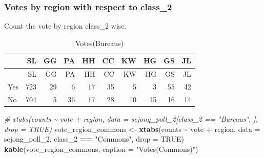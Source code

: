 \documentclass[
]{article}
\newenvironment{Shaded}{\begin{snugshade}}{\end{snugshade}}
\newcommand{\CommentTok}[1]{\textcolor[rgb]{0.56,0.35,0.01}{\textit{#1}}}
\newcommand{\DataTypeTok}[1]{\textcolor[rgb]{0.13,0.29,0.53}{#1}}
\newcommand{\DecValTok}[1]{\textcolor[rgb]{0.00,0.00,0.81}{#1}}
\newcommand{\KeywordTok}[1]{\textcolor[rgb]{0.13,0.29,0.53}{\textbf{#1}}}
\newcommand{\NormalTok}[1]{#1}
\newcommand{\OperatorTok}[1]{\textcolor[rgb]{0.81,0.36,0.00}{\textbf{#1}}}
\newcommand{\OtherTok}[1]{\textcolor[rgb]{0.56,0.35,0.01}{#1}}
\newcommand{\StringTok}[1]{\textcolor[rgb]{0.31,0.60,0.02}{#1}}
\begin{document}
\hypertarget{votes-by-region-with-respect-to-class_2}{%
\subsubsection{Votes by region with respect to
class\_2}\label{votes-by-region-with-respect-to-class_2}}

Count the vote by region class\_2 wise.

\begin{Shaded}
\end{Shaded}

\begin{longtable}[]{@{}lrrrrrrrrr@{}}
\caption{Votes(Bureaus)}\tabularnewline
\toprule
& SL & GG & PA & HH & CC & KW & HG & GS & JL\tabularnewline
\midrule
\endfirsthead
\toprule
& SL & GG & PA & HH & CC & KW & HG & GS & JL\tabularnewline
\midrule
\endhead
Yes & 723 & 29 & 6 & 17 & 35 & 5 & 3 & 55 & 42\tabularnewline
No & 704 & 5 & 36 & 17 & 28 & 10 & 15 & 16 & 14\tabularnewline
\bottomrule
\end{longtable}

\begin{Shaded}
\begin{Highlighting}[]
\CommentTok{\# xtabs(counts \textasciitilde{} vote + region, data = sejong\_poll\_2[class\_2 == "Bureaus", ], drop = TRUE)}
\NormalTok{vote\_region\_commons \textless{}{-}}\StringTok{ }\KeywordTok{xtabs}\NormalTok{(counts }\OperatorTok{\textasciitilde{}}\StringTok{ }\NormalTok{vote }\OperatorTok{+}\StringTok{ }\NormalTok{region, }\DataTypeTok{data =}\NormalTok{ sejong\_poll\_}\DecValTok{2}\NormalTok{, class\_}\DecValTok{2} \OperatorTok{==}\StringTok{ "Commons"}\NormalTok{, }\DataTypeTok{drop =} \OtherTok{TRUE}\NormalTok{)}
\KeywordTok{kable}\NormalTok{(vote\_region\_commons, }\DataTypeTok{caption =} \StringTok{"Votes(Commons)"}\NormalTok{)}
\end{Highlighting}
\end{Shaded}
\end{document}
